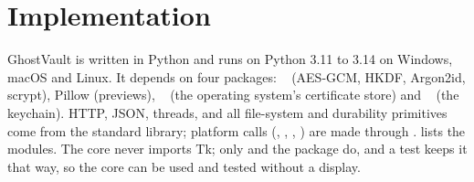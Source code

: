 \section{Implementation}\label{sec:impl}

GhostVault is written in Python and runs on Python 3.11 to 3.14 on Windows, macOS and Linux. It
depends on four packages: ~\cite{pyca} (AES-GCM, HKDF, Argon2id, scrypt),
Pillow (previews), ~\cite{truststore} (the operating system's certificate store) and
~\cite{keyring} (the keychain). HTTP, JSON, threads, and all file-system and durability
primitives come from the standard library; platform calls (,
, , ) are made through
.  lists the modules. The core never imports Tk; only 
and the  package do, and a test keeps it that way, so the core can be used and tested
without a display.

